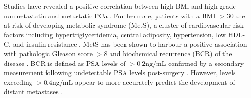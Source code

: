 Studies have revealed a positive correlation between high BMI and high-grade nonmetastatic and metastatic PCa \cite{Rodriguez2007Jan}. Furthermore, patients with a BMI $>$30 are at risk of developing metabolic syndrome (MetS), a cluster of cardiovascular risk factors including hypertriglyceridemia, central adiposity, hypertension, low HDL-C, and insulin resistance \cite{Grundy2004Jan}. MetS has been shown to harbour a positive association with pathologic Gleason score $>$8 and biochemical recurrence (BCR) of the disease \cite{Gacci2017Jun}. BCR is defined as PSA levels of $>$0.2ng/mL confirmed by a secondary measurement following undetectable PSA levels post-surgery \cite{Amling2001Apr}. However, levels exceeding $>$0.4ng/mL appear to more accurately predict the development of distant metastases \cite{Toussi2016Jun}.  

